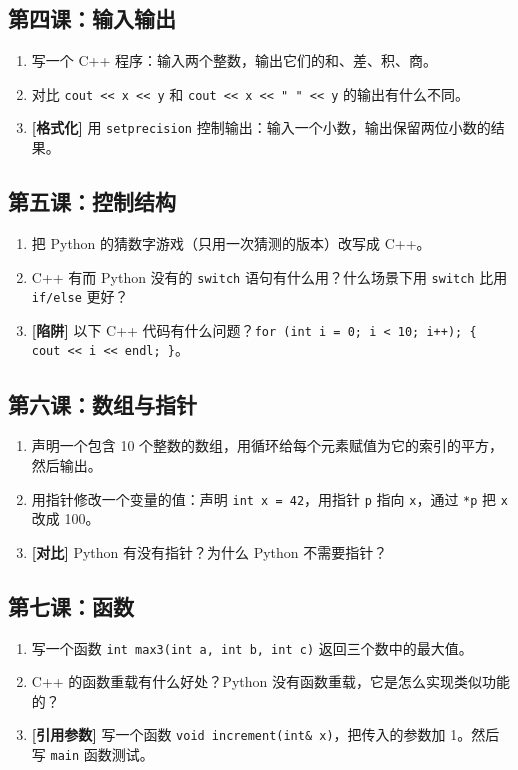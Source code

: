 \documentclass[a4paper,12pt]{ctexart}
\begin{document}
\subsection*{第四课：输入输出}
\begin{enumerate}
  \item 写一个 C++ 程序：输入两个整数，输出它们的和、差、积、商。
  \item 对比 \texttt{cout << x << y} 和 \texttt{cout << x << " " << y} 的输出有什么不同。
  \item \textbf{[格式化]} 用 \texttt{setprecision} 控制输出：输入一个小数，输出保留两位小数的结果。
\end{enumerate}

\subsection*{第五课：控制结构}
\begin{enumerate}
  \item 把 Python 的猜数字游戏（只用一次猜测的版本）改写成 C++。
  \item C++ 有而 Python 没有的 \texttt{switch} 语句有什么用？什么场景下用 \texttt{switch} 比用 \texttt{if/else} 更好？
  \item \textbf{[陷阱]} 以下 C++ 代码有什么问题？\texttt{for (int i = 0; i < 10; i++); \{ cout << i << endl; \}}。
\end{enumerate}

\subsection*{第六课：数组与指针}
\begin{enumerate}
  \item 声明一个包含 10 个整数的数组，用循环给每个元素赋值为它的索引的平方，然后输出。
  \item 用指针修改一个变量的值：声明 \texttt{int x = 42}，用指针 \texttt{p} 指向 \texttt{x}，通过 \texttt{*p} 把 \texttt{x} 改成 100。
  \item \textbf{[对比]} Python 有没有指针？为什么 Python 不需要指针？
\end{enumerate}

\subsection*{第七课：函数}
\begin{enumerate}
  \item 写一个函数 \texttt{int max3(int a, int b, int c)} 返回三个数中的最大值。
  \item C++ 的函数重载有什么好处？Python 没有函数重载，它是怎么实现类似功能的？
  \item \textbf{[引用参数]} 写一个函数 \texttt{void increment(int\& x)}，把传入的参数加 1。然后写 \texttt{main} 函数测试。
\end{enumerate}
\end{document}
